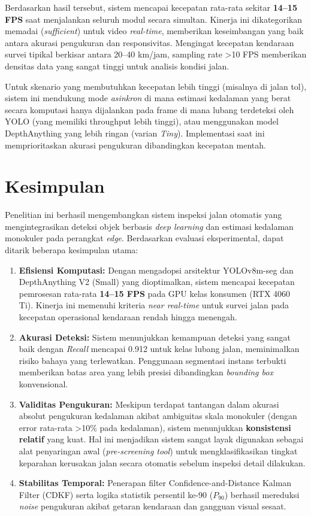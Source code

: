 \documentclass{iopjournal}
\begin{document}
Berdasarkan hasil tersebut, sistem mencapai kecepatan rata-rata sekitar \textbf{14--15 FPS} saat menjalankan seluruh modul secara simultan. Kinerja ini dikategorikan memadai (\textit{sufficient}) untuk video \textit{real-time}, memberikan keseimbangan yang baik antara akurasi pengukuran dan responsivitas. Mengingat kecepatan kendaraan survei tipikal berkisar antara 20--40 km/jam, sampling rate >10 FPS memberikan densitas data yang sangat tinggi untuk analisis kondisi jalan.

Untuk skenario yang membutuhkan kecepatan lebih tinggi (misalnya di jalan tol), sistem ini mendukung mode \textit{asinkron} di mana estimasi kedalaman yang berat secara komputasi hanya dijalankan pada frame di mana lubang terdeteksi oleh YOLO (yang memiliki throughput lebih tinggi), atau menggunakan model DepthAnything yang lebih ringan (varian \textit{Tiny}). Implementasi saat ini memprioritaskan akurasi pengukuran dibandingkan kecepatan mentah.

\section{Kesimpulan}
\label{sec:conclusion}

Penelitian ini berhasil mengembangkan sistem inspeksi jalan otomatis yang mengintegrasikan deteksi objek berbasis \textit{deep learning} dan estimasi kedalaman monokuler pada perangkat \textit{edge}. Berdasarkan evaluasi eksperimental, dapat ditarik beberapa kesimpulan utama:

\begin{enumerate}
    \item \textbf{Efisiensi Komputasi:} Dengan mengadopsi arsitektur YOLOv8m-seg dan DepthAnything V2 (Small) yang dioptimalkan, sistem mencapai kecepatan pemrosesan rata-rata \textbf{14--15 FPS} pada GPU kelas konsumen (RTX 4060 Ti). Kinerja ini memenuhi kriteria \textit{near real-time} untuk survei jalan pada kecepatan operasional kendaraan rendah hingga menengah.
    \item \textbf{Akurasi Deteksi:} Sistem menunjukkan kemampuan deteksi yang sangat baik dengan \textit{Recall} mencapai 0.912 untuk kelas lubang jalan, meminimalkan risiko bahaya yang terlewatkan. Penggunaan segmentasi instans terbukti memberikan batas area yang lebih presisi dibandingkan \textit{bounding box} konvensional.
    \item \textbf{Validitas Pengukuran:} Meskipun terdapat tantangan dalam akurasi absolut pengukuran kedalaman akibat ambiguitas skala monokuler (dengan error rata-rata >10\% pada kedalaman), sistem menunjukkan \textbf{konsistensi relatif} yang kuat. Hal ini menjadikan sistem sangat layak digunakan sebagai alat penyaringan awal (\textit{pre-screening tool}) untuk mengklasifikasikan tingkat keparahan kerusakan jalan secara otomatis sebelum inspeksi detail dilakukan.
    \item \textbf{Stabilitas Temporal:} Penerapan filter Confidence-and-Distance Kalman Filter (CDKF) serta logika statistik persentil ke-90 ($P_{90}$) berhasil mereduksi \textit{noise} pengukuran akibat getaran kendaraan dan gangguan visual sesaat.
\end{enumerate}
\end{document}
